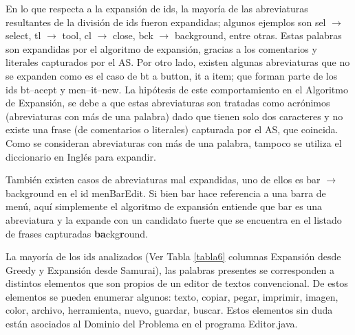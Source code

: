 En lo que respecta a la expansión de ids, la mayoría de las abreviaturas resultantes de la división de ids fueron expandidas; algunos ejemplos son \textsf{sel} $\rightarrow$ \textsf{select}, \textsf{tl} $\rightarrow$ \textsf{tool}, \textsf{cl} $\rightarrow$ \textsf{close}, \textsf{bck} $\rightarrow$ \textsf{background}, entre otras. Estas palabras son expandidas por el algoritmo de expansión, gracias a los comentarios y literales capturados por el AS.
Por otro lado, existen algunas abreviaturas que no se expanden como es el caso de \textsf{bt} a \textsf{button}, \textsf{it} a \textsf{item}; que forman parte de los ids \textsf{bt--acept} y \textsf{men--it--new}. La hipótesis de este comportamiento en el Algoritmo de Expansión, se debe a que estas abreviaturas son tratadas como acrónimos (abreviaturas con más de una palabra) dado que tienen solo dos caracteres y no existe una frase (de comentarios o literales) capturada por el AS, que coincida. Como se consideran abreviaturas con más de una palabra, tampoco se utiliza el diccionario en Inglés para expandir.

También existen casos de abreviaturas mal expandidas, uno de ellos es \textsf{bar} $\rightarrow$ \textsf{background} en el id \textsf{menBarEdit}. Si bien \textsf{bar} hace referencia a una barra de menú, aquí simplemente el algoritmo de expansión entiende que \textsf{bar} es una abreviatura y la expande con un candidato fuerte que se encuentra en el listado de frases capturadas \textsf{\textbf{ba}ckg\textbf{r}ound}.

La mayoría de los ids analizados (Ver Tabla \ref{tabla6} columnas Expansión desde Greedy y Expansión desde Samurai), las palabras presentes se corresponden a distintos elementos que son propios de un editor de textos convencional. De estos elementos se pueden enumerar algunos: texto, copiar, pegar, imprimir, imagen, color, archivo, herramienta, nuevo, guardar, buscar. Estos elementos sin duda están asociados al Dominio del Problema en el programa Editor.java.


